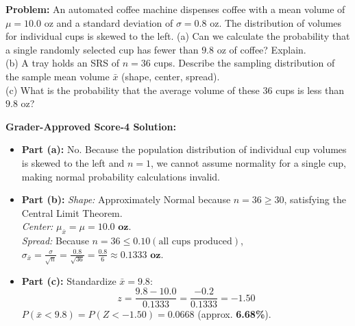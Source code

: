 \begin{workbookbox}
\textbf{Problem:} An automated coffee machine dispenses coffee with a mean volume of $\mu = 10.0\text{ oz}$ and a standard deviation of $\sigma = 0.8\text{ oz}$. The distribution of volumes for individual cups is skewed to the left.
(a) Can we calculate the probability that a single randomly selected cup has fewer than $9.8\text{ oz}$ of coffee? Explain.\\
(b) A tray holds an SRS of $n = 36$ cups. Describe the sampling distribution of the sample mean volume $\bar{x}$ (shape, center, spread).\\
(c) What is the probability that the average volume of these 36 cups is less than $9.8\text{ oz}$?

\textbf{Grader-Approved Score-4 Solution:}
\begin{itemize}[leftmargin=1.2em]
  \item \textbf{Part (a):} No. Because the population distribution of individual cup volumes is skewed to the left and $n=1$, we cannot assume normality for a single cup, making normal probability calculations invalid.
  \item \textbf{Part (b):}
  \textit{Shape:} Approximately Normal because $n = 36 \ge 30$, satisfying the Central Limit Theorem.\\
  \textit{Center:} $\mu_{\bar{x}} = \mu = \mathbf{10.0\text{ oz}}$.\\
  \textit{Spread:} Because $n=36 \le 0.10(\text{all cups produced})$, $\sigma_{\bar{x}} = \frac{\sigma}{\sqrt{n}} = \frac{0.8}{\sqrt{36}} = \frac{0.8}{6} \approx \mathbf{0.1333\text{ oz}}$.
  \item \textbf{Part (c):} Standardize $\bar{x} = 9.8$:
  \[ z = \frac{9.8 - 10.0}{0.1333} = \frac{-0.2}{0.1333} = -1.50 \]
  $P(\bar{x} < 9.8) = P(Z < -1.50) = \mathbf{0.0668}$ (approx. \textbf{6.68\%}).
\end{itemize}
\end{workbookbox}


